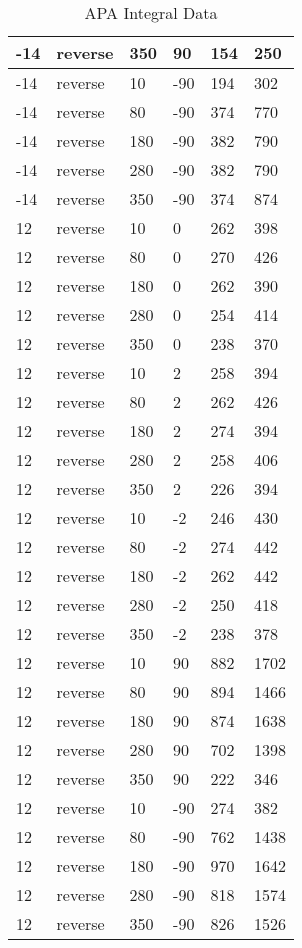 \begin{table}
\begin{center}
\begin{tabular}{|l|l|l|l|l|l|}
			\hline
			-14 & reverse & 350 & 90 & 154 & 250 \\
			\hline
			-14 & reverse & 10 & -90 & 194 & 302 \\
			\hline
			-14 & reverse & 80 & -90 & 374 & 770 \\
			\hline
			-14 & reverse & 180 & -90 & 382 & 790 \\
			\hline
			-14 & reverse & 280 & -90 & 382 & 790 \\
			\hline
			-14 & reverse & 350 & -90 & 374 & 874 \\
			\hline
			12 & reverse & 10 & 0 & 262 & 398 \\
			\hline
			12 & reverse & 80 & 0 & 270 & 426 \\
			\hline
			12 & reverse & 180 & 0 & 262 & 390 \\
			\hline
			12 & reverse & 280 & 0 & 254 & 414 \\
			\hline
			12 & reverse & 350 & 0 & 238 & 370 \\
			\hline
			12 & reverse & 10 & 2 & 258 & 394 \\
			\hline
			12 & reverse & 80 & 2 & 262 & 426 \\
			\hline
			12 & reverse & 180 & 2 & 274 & 394 \\
			\hline
			12 & reverse & 280 & 2 & 258 & 406 \\
			\hline
			12 & reverse & 350 & 2 & 226 & 394 \\
			\hline
			12 & reverse & 10 & -2 & 246 & 430 \\
			\hline
			12 & reverse & 80 & -2 & 274 & 442 \\
			\hline
			12 & reverse & 180 & -2 & 262 & 442 \\
			\hline
			12 & reverse & 280 & -2 & 250 & 418 \\
			\hline
			12 & reverse & 350 & -2 & 238 & 378 \\
			\hline
			12 & reverse & 10 & 90 & 882 & 1702 \\
			\hline
			12 & reverse & 80 & 90 & 894 & 1466 \\
			\hline
			12 & reverse & 180 & 90 & 874 & 1638 \\
			\hline
			12 & reverse & 280 & 90 & 702 & 1398 \\
			\hline
			12 & reverse & 350 & 90 & 222 & 346 \\
			\hline
			12 & reverse & 10 & -90 & 274 & 382 \\
			\hline
			12 & reverse & 80 & -90 & 762 & 1438 \\
			\hline
			12 & reverse & 180 & -90 & 970 & 1642 \\
			\hline
			12 & reverse & 280 & -90 & 818 & 1574 \\
			\hline
			12 & reverse & 350 & -90 & 826 & 1526 \\
			\hline
		\end{tabular}
	\end{center}
	\caption{APA Integral Data}
	\label{tab:apa_sum}
\end{table}